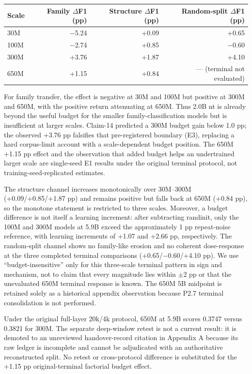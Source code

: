 \begin{longtable}[]{@{}lrrr@{}}
\toprule
Scale & Family \(\Delta\)F1 (pp) & Structure \(\Delta\)F1 (pp) & Random-split \(\Delta\)F1 (pp) \\
\midrule
\endhead
30M & \(-\)5.24 & +0.09 & +0.65 \\
100M & \(-\)2.74 & +0.85 & \(-\)0.60 \\
300M & +3.76 & +1.87 & +4.10 \\
650M & +1.15 & +0.84 & --- (terminal not evaluated) \\
\bottomrule
\end{longtable}

For family transfer, the effect is negative at 30M and 100M but positive at 300M and 650M, with the positive return attenuating at 650M. Thus 2.0B nt is already beyond the useful budget for the smaller family-classification models but is insufficient at larger scales. Claim-14 predicted a 300M budget gain below 1.0 pp; the observed +3.76 pp falsifies that pre-registered boundary (E3), replacing a hard corpus-limit account with a scale-dependent budget position. The 650M +1.15 pp effect and the observation that added budget helps an undertrained larger scale are single-seed E1 results under the original terminal protocol, not training-seed-replicated estimates.

The structure channel increases monotonically over 30M--300M (+0.09/+0.85/+1.87 pp) and remains positive but falls back at 650M (+0.84 pp), so the monotone statement is restricted to three scales. Moreover, a budget difference is not itself a learning increment: after subtracting randinit, only the 100M and 300M models at 5.9B exceed the approximately 1 pp repeat-noise reference, with learning increments of +1.07 and +2.66 pp, respectively. The random-split channel shows no family-like erosion and no coherent dose-response at the three completed terminal comparisons (+0.65/\(-\)0.60/+4.10 pp). We use ``budget-insensitive'' only for this three-scale terminal pattern in sign and mechanism, not to claim that every magnitude lies within \(\pm\)2 pp or that the unevaluated 650M terminal response is known. The 650M 5B midpoint is retained solely as a historical appendix observation because P2.7 terminal consolidation is not performed.

Under the original full-layer 20k/4k protocol, 650M at 5.9B scores 0.3747 versus 0.3821 for 300M. The separate deep-window retest is not a current result: it is demoted to an unreviewed handover-record citation in Appendix A because its raw ledger is incomplete and cannot be adjudicated with an authoritative reconstructed split. No retest or cross-protocol difference is substituted for the +1.15 pp original-terminal factorial budget effect.

